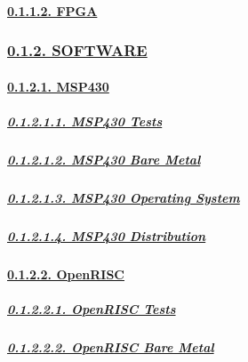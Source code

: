 \documentclass[
]{article}
\begin{document}
\hypertarget{fpga}{%
\paragraph{\texorpdfstring{\protect\hyperlink{fpga-1}{0.1.1.2.
FPGA}}{0.1.1.2. FPGA}}\label{fpga}}

\hypertarget{software}{%
\subsubsection{\texorpdfstring{\protect\hyperlink{software-1}{0.1.2.
SOFTWARE}}{0.1.2. SOFTWARE}}\label{software}}

\hypertarget{msp430}{%
\paragraph{\texorpdfstring{\protect\hyperlink{msp430-3}{0.1.2.1.
MSP430}}{0.1.2.1. MSP430}}\label{msp430}}

\hypertarget{msp430-tests}{%
\subparagraph{\texorpdfstring{\protect\hyperlink{msp430-tests-1}{0.1.2.1.1.
MSP430 Tests}}{0.1.2.1.1. MSP430 Tests}}\label{msp430-tests}}

\hypertarget{msp430-bare-metal}{%
\subparagraph{\texorpdfstring{\protect\hyperlink{msp430-bare-metal-1}{0.1.2.1.2.
MSP430 Bare
Metal}}{0.1.2.1.2. MSP430 Bare Metal}}\label{msp430-bare-metal}}

\hypertarget{msp430-operating-system}{%
\subparagraph{\texorpdfstring{\protect\hyperlink{msp430-operating-system-1}{0.1.2.1.3.
MSP430 Operating
System}}{0.1.2.1.3. MSP430 Operating System}}\label{msp430-operating-system}}

\hypertarget{msp430-distribution}{%
\subparagraph{\texorpdfstring{\protect\hyperlink{msp430-distribution-1}{0.1.2.1.4.
MSP430
Distribution}}{0.1.2.1.4. MSP430 Distribution}}\label{msp430-distribution}}

\hypertarget{openrisc}{%
\paragraph{\texorpdfstring{\protect\hyperlink{openrisc-3}{0.1.2.2.
OpenRISC}}{0.1.2.2. OpenRISC}}\label{openrisc}}

\hypertarget{openrisc-tests}{%
\subparagraph{\texorpdfstring{\protect\hyperlink{openrisc-tests-1}{0.1.2.2.1.
OpenRISC Tests}}{0.1.2.2.1. OpenRISC Tests}}\label{openrisc-tests}}

\hypertarget{openrisc-bare-metal}{%
\subparagraph{\texorpdfstring{\protect\hyperlink{openrisc-bare-metal-1}{0.1.2.2.2.
OpenRISC Bare
Metal}}{0.1.2.2.2. OpenRISC Bare Metal}}\label{openrisc-bare-metal}}
\end{document}
